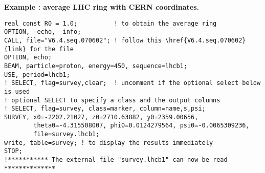 {\bf Example : average LHC ring with CERN coordinates.}
\begin{verbatim}
real const R0 = 1.0;          ! to obtain the average ring
OPTION, -echo, -info;
CALL, file="V6.4.seq.070602"; ! follow this \href{V6.4.seq.070602}{link} for the file
OPTION, echo;
BEAM, particle=proton, energy=450, sequence=lhcb1;
USE, period=lhcb1;
! SELECT, flag=survey,clear;  ! uncomment if the optional select below is used
! optional SELECT to specify a class and the output columns
! SELECT, flag=survey, class=marker, column=name,s,psi;
SURVEY, x0=-2202.21027, z0=2710.63882, y0=2359.00656,
        theta0=-4.315508007, phi0=0.0124279564, psi0=-0.0065309236,
        file=survey.lhcb1;
write, table=survey; ! to display the results immediately
STOP;
!*********** The external file "survey.lhcb1" can now be read **************
\end{verbatim}

